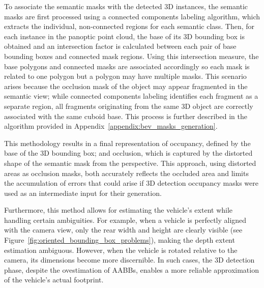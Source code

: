 To associate the  semantic masks with the detected 3D instances, the semantic masks are first processed using a connected components labeling algorithm, which extracts the individual, non-connected regions for each semantic class. Then, for each instance in the panoptic point cloud, the base of its 3D bounding box is obtained and an intersection factor is calculated between each pair of base bounding boxes and connected mask regions. Using this intersection measure, the base polygons and connected masks are associated accordingly so each mask is related to one polygon but a polygon may have multiple masks. This scenario arises because the occlusion mask of the object may appear fragmented in the  semantic view; while connected components labeling identifies each fragment as a separate region, all fragments originating from the same 3D object are correctly associated with the same cuboid base. This process is further described in the algorithm provided in Appendix~\ref{appendix:bev_masks_generation}.

This methodology results in a final representation of occupancy, defined by the base of the 3D bounding box; and occlusion, which is captured by the distorted shape of the semantic mask from the  perspective. This approach, using distorted areas as occlusion masks, both accurately reflects the occluded area and limits the accumulation of errors that could arise if 3D detection occupancy masks were used as an intermediate input for their generation.

Furthermore, this method allows for estimating the vehicle's extent while handling certain ambiguities. For example, when a vehicle is perfectly aligned with the camera view, only the rear width and height are clearly visible (see Figure~\ref{fig:oriented_bounding_box_problems}), making the depth extent estimation ambiguous. However, when the vehicle is rotated relative to the camera, its dimensions become more discernible. In such cases, the 3D detection phase, despite the ovestimation of \acp{AABB}, enables a more reliable approximation of the vehicle's actual footprint.

